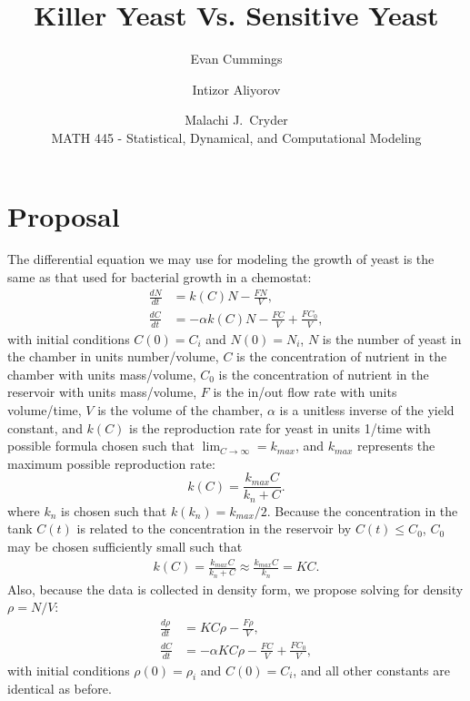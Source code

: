 


\small

\title{Killer Yeast Vs. Sensitive Yeast}
\author{Evan Cummings \and Intizor Aliyorov \and Malachi J.\ Cryder\\
MATH 445 - Statistical, Dynamical, and Computational Modeling}

\maketitle

\section*{Proposal}
The differential equation we may use for modeling the growth of yeast is the same as that used for bacterial growth in a chemostat:
\begin{align*}
  \frac{dN}{dt} &= k(C) N - \frac{FN}{V}, \\
  \frac{dC}{dt} &= -\alpha k(C) N - \frac{FC}{V} + \frac{FC_0}{V},
\end{align*}
with initial conditions $C(0) = C_i$ and $N(0) = N_i$, $N$ is the number of yeast in the chamber in units number/volume, $C$ is the concentration of nutrient in the chamber with units mass/volume, $C_0$ is the concentration of nutrient in the reservoir with units mass/volume, $F$ is the in/out flow rate with units volume/time, $V$ is the volume of the chamber, $\alpha$ is a unitless inverse of the yield constant, and $k(C)$ is the reproduction rate for yeast in units 1/time with possible formula chosen such that $\lim_{C \rightarrow \infty} = k_{max}$, and $k_{max}$ represents the maximum possible reproduction rate:
$$k(C) = \frac{k_{max} C}{k_n + C}.$$
where $k_n$ is chosen such that $k(k_n) = k_{max} / 2$.  Because the concentration in the tank $C(t)$ is related to the concentration in the reservoir by $C(t) \leq C_0$, $C_0$ may be chosen sufficiently small such that 
\begin{align*}
  k(C) = \frac{k_{max} C}{k_n + C} \approx \frac{k_{max} C}{k_n} = KC.
\end{align*}
Also, because the data is collected in density form, we propose solving for density $\rho = N/V$:
\begin{align}
  \frac{d\rho}{dt} &= KC \rho - \frac{F\rho}{V}, \\
  \frac{dC}{dt} &= -\alpha KC \rho - \frac{FC}{V} + \frac{FC_0}{V},
\end{align}
with initial conditions $\rho(0) = \rho_i$ and $C(0) = C_i$, and all other constants are identical as before.

